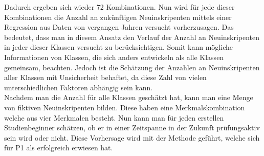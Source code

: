 \noindent Dadurch ergeben sich wieder 72 Kombinationen. Nun wird f\"ur jede dieser Kombinationen die Anzahl an zuk\"unftigen Neuinskripenten mittels einer Regression aus Daten von 
vergangen Jahren versucht vorherzusagen. Das bedeutet, dass man in diesem Ansatz den Verlauf der Anzahl an Neuinskripenten in jeder dieser Klassen versucht zu 
ber\"ucksichtigen. Somit kann m\"ogliche Informationen von Klassen, die sich anders entwickeln als alle Klassen gemeinsam, beachten. Jedoch ist die Sch\"atzung der 
Anzahlen an Neuinskripenten aller Klassen mit Unsicherheit behaftet, da diese Zahl von vielen unterschiedlichen Faktoren abh\"angig sein kann. \\

\noindent Nachdem man die Anzahl f\"ur alle Klassen gesch\"atzt hat, kann man eine Menge von fiktiven Neuinskripenten bilden. Diese haben eine Merkmalskombination  
welche aus vier Merkmalen besteht. Nun kann man f\"ur jeden erstellen Studienbeginner sch\"atzen, ob er in einer Zeitspanne in der Zukunft pr\"ufungsaktiv sein wird oder nicht. 
Diese Vorhersage wird mit der Methode gef\"uhrt, welche sich f\"ur P1 als erfolgreich erwiesen hat. 